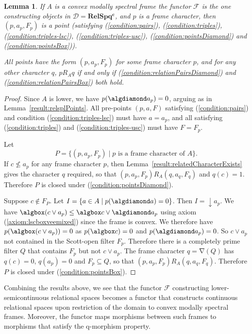 \documentclass{article}[a4paper]
\newtheorem{lemma}{Lemma}%
\theoremstyle{definition}
\newcommand{\Dcal}{\mathcal{D}} %
\newcommand{\Fcal}{\mathcal{F}} %
\newcommand{\relspqc}{\mathbf{RelSpq^c}}
\DeclareMathOperator{\charop}{\nabla}
\DeclareMathOperator{\downset}{\downarrow}
\begin{document}
\begin{lemma}
\label{result:canonicalTripleIsAPoint}
If $A$ is a convex modally spectral frame the functor $\Fcal$ is the one constructing objects in $\Dcal = \relspqc$, and $p$ is a frame character, then 
$(p,a_p,F_p)$ is a point (satisfying (\ref{condition:pairs}), (\ref{condition:triples}), (\ref{condition:triples-lsc}), (\ref{condition:triples-usc}), (\ref{condition:pointsDiamond}) and (\ref{condition:pointsBox})).

All points have the form $(p, a_p, F_p)$ for some frame character $p$, and for any other character $q$,
$p R_A q$ if and only if (\ref{condition:relationPairsDiamond}) and (\ref{condition:relationPairsBox}) both hold.
\end{lemma}

\begin{proof}
Since $A$ is lower, we have $p(\algdiamond a_p) = 0$, arguing as in Lemma~\ref{result:relsplPoints}. All pre-points $(p,a,F)$ satisfying (\ref{condition:pairs}) and condition (\ref{condition:triples-lsc}) must have $a=a_p$, and all satisfying (\ref{condition:triples}) and (\ref{condition:triples-usc}) must have $F = F_p$. 

Let 
\begin{equation*}
P = \{ (p,a_p,F_p) \mid p \mbox{ is a frame character of } A \} .
\end{equation*}
If $c\nleq a_p$ for any frame character $p$, then Lemma~\ref{result:relatedCharacterExists} gives the character $q$ required, so that $(p,a_p,F_p) R_A (q,a_q,F_q)$ and $q(c)=1$. Therefore $P$ is closed under (\ref{condition:pointsDiamond}).

Suppose $c \notin F_P$. 
Let $I = \{ a \in A \mid p(\algdiamond a) = 0 \}$. 
Then $I = \downset a_p$. 
We have 
$\algbox( c \vee a_p) \leq \algbox c \vee \algdiamond a_p$ using axiom (\ref{axiom:lscboxveemixed}) since the frame is convex. We therefore have $p(\algbox( c \vee a_p)) = 0$ as $p(\algbox c)=0$ and 
$p(\algdiamond a_p)=0$. 
So $c \vee a_p$ not contained in the Scott-open filter $F_p$. Therefore there is a completely prime filter $Q$ that contains $F_p$ but not $c \vee a_p$. The frame character $q = \charop(Q)$ has $q(c) = 0$, $q(a_p)=0$ and $F_p \subseteq Q$, so that $(p,a_p,F_p) R_A (q,a_q,F_q)$. Therefore $P$ is closed under (\ref{condition:pointsBox}). 
\end{proof}

Combining the results above, we see that the functor $\Fcal$ constructing lower-semicontinuous relational spaces becomes a functor that constructs continuous relational spaces upon restriction of the domain to convex modally spectral frames. Moreover, the functor maps morphisms between such frames to morphisms that satisfy the q-morphism property. 
\end{document}
